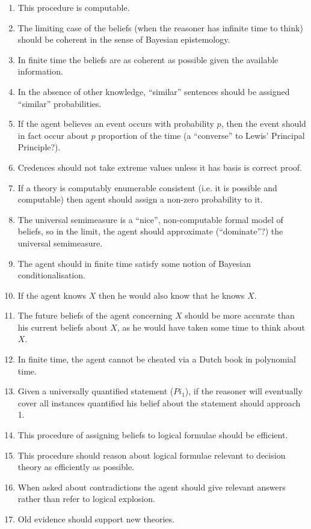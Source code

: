 \documentclass{article}
\begin{document}
\begin{enumerate}
\item This procedure is computable.
\item The limiting case of the beliefs (when the reasoner has infinite time to think) should be coherent in the sense of Bayesian epistemology.
\item In finite time the beliefs are as coherent as possible given the available information.
\item In the absence of other knowledge, ``similar'' sentences should be assigned ``similar'' probabilities.
\item If the agent believes an event occurs with probability $p$, then the event should in fact occur about $p$ proportion of the time (a ``converse'' to Lewis' Principal Principle?).
\item Credences should not take extreme values unless it has basis is correct proof.
\item If a theory is computably enumerable consistent (i.e. it is possible and computable) then agent should assign a non-zero probability to it.
\item The universal semimeasure is a ``nice'', non-computable formal model of beliefs, so in the limit, the agent should approximate (``dominate''?) the universal semimeasure.
\item The agent should in finite time satisfy some notion of Bayesian conditionalisation.
\item If the agent knows $X$ then he would also know that he knows $X$.
\item The future beliefs of the agent concerning $X$ should be more accurate than his current beliefs about $X$, as he would have taken some time to think about $X$.
\item In finite time, the agent cannot be cheated via a Dutch book in polynomial time.
\item Given a universally quantified statement ($Pi_1$), if the reasoner will eventually cover all instances quantified his belief about the statement should approach 1.
\item This procedure of assigning beliefs to logical formulae should be efficient.
\item This procedure should reason about logical formulae relevant to decision theory as efficiently as possible.
\item When asked about contradictions the agent should give relevant answers rather than refer to logical explosion.
\item Old evidence should support new theories.
\end{enumerate}
\end{document}
